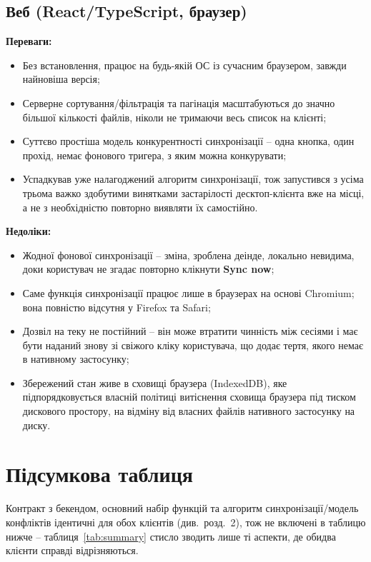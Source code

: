 \documentclass[12pt,a4paper]{article}
\begin{document}
\subsection{Веб (React/TypeScript, браузер)}

\textbf{Переваги:}
\begin{itemize}[nosep]
    \item Без встановлення, працює на будь-якій ОС із сучасним браузером, завжди найновіша версія;
    \item Серверне сортування/фільтрація та пагінація масштабуються до значно більшої кількості файлів, ніколи не тримаючи весь список на клієнті;
    \item Суттєво простіша модель конкурентності синхронізації -- одна кнопка, один прохід, немає фонового тригера, з яким можна конкурувати;
    \item Успадкував уже налагоджений алгоритм синхронізації, тож запустився з усіма трьома важко здобутими винятками застарілості десктоп-клієнта вже на місці, а не з необхідністю повторно виявляти їх самостійно.
\end{itemize}

\textbf{Недоліки:}
\begin{itemize}[nosep]
    \item Жодної фонової синхронізації -- зміна, зроблена деінде, локально невидима, доки користувач не згадає повторно клікнути \textbf{Sync now};
    \item Саме функція синхронізації працює лише в браузерах на основі Chromium; вона повністю відсутня у Firefox та Safari;
    \item Дозвіл на теку не постійний -- він може втратити чинність між сесіями і має бути наданий знову зі свіжого кліку користувача, що додає тертя, якого немає в нативному застосунку;
    \item Збережений стан живе в сховищі браузера (IndexedDB), яке підпорядковується власній політиці витіснення сховища браузера під тиском дискового простору, на відміну від власних файлів нативного застосунку на диску.
\end{itemize}

\section{Підсумкова таблиця}

Контракт з бекендом, основний набір функцій та алгоритм синхронізації/модель конфліктів ідентичні для обох клієнтів (див.\ розд.~2), тож не включені в таблицю нижче -- таблиця~\ref{tab:summary} стисло зводить лише ті аспекти, де обидва клієнти справді відрізняються.
\end{document}
